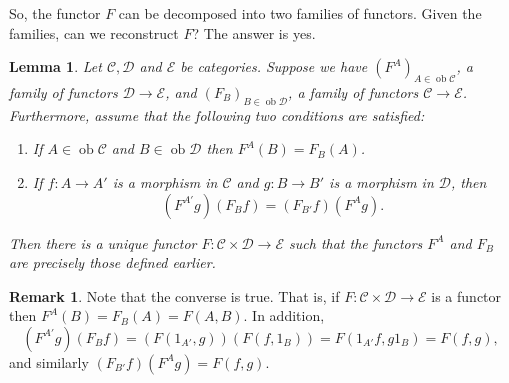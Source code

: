 \documentclass{report}
\DeclareMathOperator{\ob}{ob}
\theoremstyle{definition}
\theoremstyle{plain}
\newtheorem{lem}[thm]{Lemma}
\theoremstyle{definition}
\newtheorem{rem}[thm]{Remark}
\begin{document}
	 So, the functor $F$ can be decomposed into two families of functors. Given the families, can we reconstruct $F$? The answer is yes.
	\begin{lem}\label{lem:prod_fam}
		Let $\mathcal{C},\mathcal{D}$ and $\mathcal{E}$ be categories. Suppose we have $(F^A)_{A\in\ob\mathcal{C}}$, a family of functors $\mathcal{D}\to \mathcal{E}$,  and $(F_B)_{B\in\ob\mathcal{D}}$, a family of functors $\mathcal{C}\to\mathcal{E}$. Furthermore, assume that the following two conditions are satisfied:
		\begin{enumerate}[label=(\alph*)]
			\item If $A\in\ob\mathcal{C}$ and $B\in\ob\mathcal{D}$ then $F^A(B) = F_B(A)$.
			\item If $f\colon A \to A'$ is a morphism in $\mathcal{C}$ and $g\colon B\to B'$ is a morphism in $\mathcal{D}$, then 
			\[
				(F^{A'}g)(F_Bf) = (F_{B'}f)(F^Ag).
			\]
		\end{enumerate}
		Then there is a unique functor $F\colon \mathcal{C}\times \mathcal{D} \to \mathcal{E}$ such that the functors $F^A$ and $F_B$ are precisely those defined earlier.
		\end{lem}
		\begin{rem}\label{rem:prod_dec_prop}
			Note that the converse is true. That is, if $F\colon \mathcal{C}\times \mathcal{D} \to \mathcal{E}$ is a functor then $F^A(B) = F_B(A) = F(A,B)$. In addition,
			\[
				(F^{A'}g)(F_Bf) = (F(1_{A'},g))(F(f,1_B))= F(1_{A'}f, g1_B) = F(f,g),
			\] 
			and similarly $(F_{B'}f)(F^{A}g)=F(f,g)$.
		\end{rem}
\end{document}
